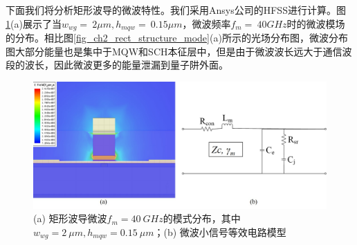下面我们将分析矩形波导的微波特性。我们采用Ansys公司的HFSS进行计算\cite{ansyshfss}。图\ref{fig_ch2_rect_microwave_mode_equal_circuits}(a)展示了当$w_{wg} =~2 \mu m, h_{mqw} =~ 0.15 \mu m$，微波频率$f_m =~ 40 GHz$时的微波模场的分布。相比图\ref{fig_ch2_rect_structure_mode}(a)所示的光场分布图，微波分布图大部分能量也是集中于MQW和SCH本征层中，但是由于微波波长远大于通信波段的波长，因此微波更多的能量泄漏到量子阱外面。
\begin{figure}[htb]
	\centering
	\includegraphics[width=12cm]{./Pictures/fig_ch2_rect_microwave_mode_equal_circuits.jpg}
	\caption{(a) 矩形波导微波$f_m = 40~GHz$的模式分布，其中$w_{wg} = 2~\mu m, h_{mqw} = 0.15~\mu m$；(b) 微波小信号等效电路模型}
	\label{fig_ch2_rect_microwave_mode_equal_circuits}
\end{figure}

